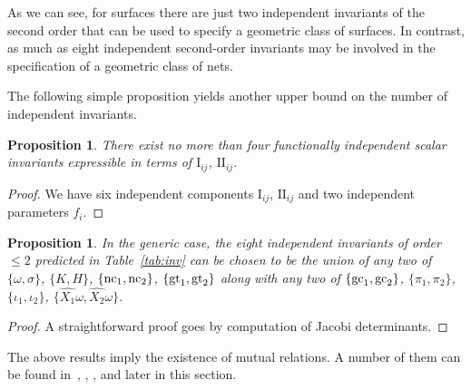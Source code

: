 \documentclass[pdftex]{sigma}
\def\rmref#1{{\rm\ref{#1}}}
\def\I#1#2{\mathrm{I}_{#1#2}}
\def\II#1#2{\mathrm{II}_{#1#2}}
\def\nc#1{{\mathop{\rm nc}}_{#1}}
\def\gc#1{{\mathop{\rm gc}}_{#1}}
\def\gtor#1{{{\rm gt}}_{#1}}
\newtheorem{Proposition}[Theorem]{Proposition}
 { \theoremstyle{definition}
\newtheorem{construction}[Theorem]{Construction}
\newtheorem{Definition}[Theorem]{Definition}
\newtheorem{Example}[Theorem]{Example}
\newtheorem{Remark}[Theorem]{Remark} }
\numberwithin{equation}{section}
\begin{document}
As we can see, for surfaces there are just two independent invariants of the second order
that can be used to specify a geometric class of surfaces.
In contrast, as much as eight independent second-order invariants may be
involved in the specification of a geometric class of nets.

The following simple proposition yields another upper bound on the number of
independent invariants.

\begin{Proposition}
There exist no more than four functionally independent scalar invariants
expressible in terms of $\I ij$, $\II ij$.
\end{Proposition}


\begin{proof}
We have six
independent components $\I ij$, $\II ij$ and two independent parameters $f_i$.
\end{proof}


\begin{Proposition}
In the generic case,
the eight independent invariants of order $\le 2$ predicted in Table~\rmref{tab:inv}
can be chosen to be the union of any two of
$\{\omega,\sigma\}$, $\{K,H\}$, $\{\nc1,\nc2\}$, $\{\gtor1,\gtor2\}$ along with any
two of $\{\gc1,\gc2\}$, $\{\pi_1,\pi_2\}$, $\{\iota_1,\iota_2\}$,
$\bigl\{\widehat{X_1} \omega, \widehat{X_2} \omega\bigr\}$.
\end{Proposition}

\begin{proof}
A straightforward proof goes by computation of Jacobi determinants.
\end{proof}

The above results imply the existence of mutual relations.
A number of them can be found in~\cite{WS-I,WS-II,WS-III}, \cite[Chapter~4]{Spi-III},
\cite[Section~93]{VIS}, and later in this section.
\end{document}
